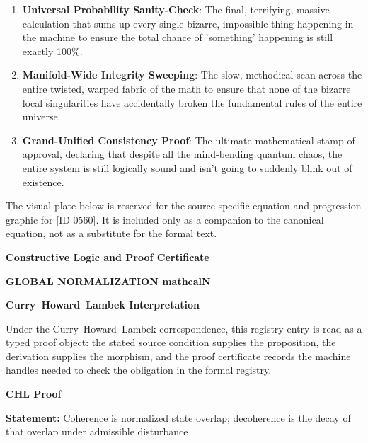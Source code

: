 \begin{enumerate}[leftmargin=1.6em,itemsep=6pt,topsep=4pt]
\item \textbf{Universal Probability Sanity-Check}: The final, terrifying, massive calculation that sums up every single bizarre, impossible thing happening in the machine to ensure the total chance of 'something' happening is still exactly 100\%.
\item \textbf{Manifold-Wide Integrity Sweeping}: The slow, methodical scan across the entire twisted, warped fabric of the math to ensure that none of the bizarre local singularities have accidentally broken the fundamental rules of the entire universe.
\item \textbf{Grand-Unified Consistency Proof}: The ultimate mathematical stamp of approval, declaring that despite all the mind-bending quantum chaos, the entire system is still logically sound and isn't going to suddenly blink out of existence.
\end{enumerate}

\begingroup\footnotesize\sloppy
The visual plate below is reserved for the source-specific equation and progression graphic for [ID 0560]. It is included only as a companion to the canonical equation, not as a substitute for the formal text.
\par\endgroup
\ifTZPDarkEdition
{}
\fi

\clearpage
\begingroup\tzpsupportsetup
\noindent\textbf{\fontsize{10.8pt}{12.8pt}\selectfont [ID 0560] Constructive Logic and Proof Certificate}\par
\noindent\textbf{\fontsize{10pt}{12pt}\selectfont GLOBAL NORMALIZATION mathcalN}\par
\vspace{0.45em}
\begingroup
\footnotesize
\setlength{\parskip}{0.22em}
\setlength{\parindent}{0pt}
\noindent\textbf{Curry--Howard--Lambek Interpretation}\par
Under the Curry--Howard--Lambek correspondence, this registry entry is read as a typed proof
object: the stated source condition supplies the proposition, the derivation supplies the
morphism, and the proof certificate records the machine handles needed to check the obligation
in the formal registry.

\vspace{0.45em}
\noindent\textbf{CHL Proof}\par
\textbf{Statement:} Coherence is normalized state overlap; decoherence is the decay of that overlap under
admissible disturbance

